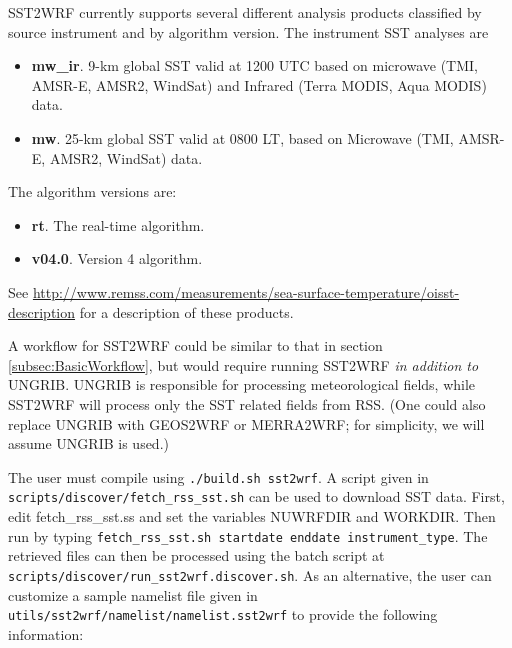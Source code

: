 SST2WRF currently supports several different analysis products classified by 
source instrument and by algorithm version. The instrument SST analyses are
\begin{itemize}
\item \textbf{mw\_ir}. 9-km global SST valid at 1200 UTC based on microwave 
  (TMI, AMSR-E, AMSR2, WindSat) and Infrared (Terra MODIS, Aqua MODIS) data.
\item \textbf{mw}. 25-km global SST valid at 0800 LT, based on Microwave (TMI,
  AMSR-E, AMSR2, WindSat) data.
\end{itemize}

The algorithm versions are:
\begin{itemize}
\item \textbf{rt}. The real-time algorithm.
\item \textbf{v04.0}. Version 4 algorithm.
\end{itemize}

See \url{http://www.remss.com/measurements/sea-surface-temperature/oisst-description} for a description of these products.

A workflow for SST2WRF could be similar to that in section 
\ref{subsec:BasicWorkflow}, but would require running SST2WRF \emph{in 
addition to} UNGRIB. UNGRIB is responsible for processing meteorological 
fields, while SST2WRF will process only the SST related fields from RSS. (One 
could also replace UNGRIB with GEOS2WRF or MERRA2WRF; for simplicity, we will
assume UNGRIB is used.)

The user must compile using \texttt{./build.sh sst2wrf}. A script given in \\
\texttt{scripts/discover/fetch\_rss\_sst.sh} can be used to download SST data. First,
edit fetch\_rss\_sst.ss and set the variables NUWRFDIR
and WORKDIR. Then run by typing \texttt{fetch\_rss\_sst.sh startdate enddate instrument\_type}.
The retrieved files can then be processed using the batch script at\\ 
\texttt{scripts/discover/run\_sst2wrf.discover.sh}. As an alternative, the
user can customize a sample namelist file given in \\
\texttt{utils/sst2wrf/namelist/namelist.sst2wrf} to provide the 
following information:\\

